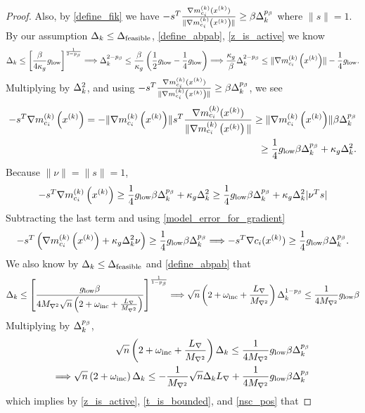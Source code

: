 \begin{proof}
Also, by \cref{define_fik} we have $-s^T {\frac{\nabla m^{(k)}_{c_i}(x^{(k)})}{\|\nabla m^{(k)}_{c_i}\left(x^{(k)}\right)\|}} \ge \beta \Delta_k^{p_{\beta}}$ where $\|s\| = 1$.
By our assumption $\Delta_k \le {\Delta_{\textrm{feasible}}}$, \cref{define_abpab}, \cref{z_is_active} we know
\begin{align*}
\Delta_k \le \left[\frac{\beta}{4\kappa_g}{ g_{\textrm{low}} } \right]^{\frac 1 {2 - p_{\beta}}}
\Longrightarrow \Delta_k^{2 - p_{\beta}} \le \frac{\beta}{\kappa_g}\left(\frac 1 2{ g_{\textrm{low}} }  - \frac 1 4 { g_{\textrm{low}} } \right)
\Longrightarrow \frac{\kappa_g}{\beta} \Delta_k^{2 - p_{\beta}} \le \|{\nabla m_{c_i}^{(k)}\left(x^{(k)}\right)}\| - \frac 1 4 { g_{\textrm{low}} }.
\end{align*}
Multiplying by $\Delta_k^2$, and using $-s^T {\frac{\nabla m^{(k)}_{c_i}(x^{(k)})}{\|\nabla m^{(k)}_{c_i}\left(x^{(k)}\right)\|}} \ge \beta \Delta_k^{p_{\beta}}$, we see
\begin{align*}
-s^T{\nabla m_{c_i}^{(k)}\left(x^{(k)}\right)} =  -\|{\nabla m_{c_i}^{(k)}\left(x^{(k)}\right)}\|s^T{\frac{\nabla m^{(k)}_{c_i}(x^{(k)})}{\|\nabla m^{(k)}_{c_i}\left(x^{(k)}\right)\|}} \ge \|{\nabla m_{c_i}^{(k)}\left(x^{(k)}\right)}\|\beta\Delta_k^{p_{\beta}} \\
\ge \frac 1 4 { g_{\textrm{low}} }  \beta \Delta_k^{p_{\beta}} + \kappa_g\Delta_k^2.
\end{align*}
Because $\|\nu\| = \|s\| = 1$,
\begin{align*}
-s^T{\nabla m_{c_i}^{(k)}\left(x^{(k)}\right)} \ge \frac 1 4 { g_{\textrm{low}} }  \beta \Delta_k^{p_{\beta}} + \kappa_g\Delta_k^2 \ge \frac 1 4 { g_{\textrm{low}} }  \beta \Delta_k^{p_{\beta}} + \kappa_g\Delta_k^2|\nu^T s|
\end{align*}
Subtracting the last term and using \cref{model_error_for_gradient}
\begin{align}
-s^T\left({\nabla m_{c_i}^{(k)}\left(x^{(k)}\right)} + \kappa_g\Delta_k^2\nu\right) \ge \frac 1 4 { g_{\textrm{low}} }  \beta \Delta_k ^{p_{\beta}}
\Longrightarrow -s^T\nabla c_i(x^{(k)}) \ge \frac 1 4 { g_{\textrm{low}} }  \beta \Delta_k^{p_{\beta}}. \label{nsc_pos}
\end{align}
We also know by $\Delta_k \le {\Delta_{\textrm{feasible}}}$ and \cref{define_abpab} that
\begin{align*}
\Delta_k \le \left[\frac {{ g_{\textrm{low}} }  \beta} {4{M_{\nabla^2}}\sqrt{n}\left(2 + \omega_{\text{inc}} + \frac {{L_{\nabla}}} {{M_{\nabla^2}}} \right)}\right]^{\frac1 {1 - p_{\beta}} }
\Longrightarrow \sqrt{n}\left(2 + \omega_{\text{inc}} + \frac {{L_{\nabla}}} {{M_{\nabla^2}}} \right) \Delta_k^{1-p_{\beta}}\le \frac 1 {4{M_{\nabla^2}}} { g_{\textrm{low}} }  \beta
\end{align*}
Multiplying by $\Delta_k^{p_{\beta}}$,
\begin{align*}
\sqrt{n}\left(2 + \omega_{\text{inc}} + \frac {{L_{\nabla}}} {{M_{\nabla^2}}} \right) \Delta_k \le \frac 1 {4{M_{\nabla^2}}} { g_{\textrm{low}} }  \beta \Delta_k^{p_{\beta}} \\
\Longrightarrow \sqrt{n}\left(2 + \omega_{\text{inc}} \right) \Delta_k \le -\frac 1 {{M_{\nabla^2}}} \sqrt{n}\Delta_k {L_{\nabla}} + \frac 1 {4{M_{\nabla^2}}} { g_{\textrm{low}} }  \beta \Delta_k^{p_{\beta}}
\end{align*}
which implies by \cref{z_is_active}, \cref{t_is_bounded}, and \cref{nsc_pos} that

\end{proof}
